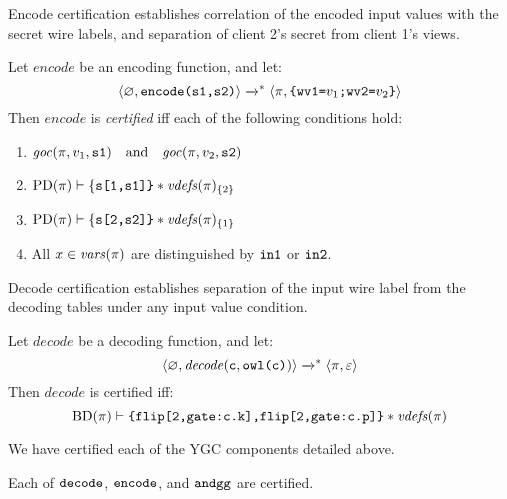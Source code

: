 Encode certification establishes correlation of the encoded input values with
the secret wire labels, and separation of client 2's secret from client 1's views. 
\begin{definition}
  \label{definition-ygcencode-certification}
  Let $\mathit{encode}$ be an encoding function, and let:
  $$
  \langle \varnothing,\texttt{encode(s1,s2)} \rangle \xrightarrow{}^{*}
  \langle \pi,\texttt{\{wv1=}v_1\texttt{;wv2=}v_2\texttt{\}} \rangle
  $$
  Then $\mathit{encode}$ is \emph{certified} iff each of the following conditions hold:
  \begin{enumerate}[\hspace{5mm}i.]
  \item $\mathit{goc}(\pi,v_1,\texttt{s1}) \quad \text{and} \quad \mathit{goc}(\pi,v_2,\texttt{s2})$
  \item $\mathrm{PD}(\pi) \vdash \{\texttt{s[1,s1]\}} * \mathit{vdefs}(\pi)_{\{2\}}$
  \item $\mathrm{PD}(\pi) \vdash \{\texttt{s[2,s2]\}} * \mathit{vdefs}(\pi)_{\{1\}}$    
  \item All $x \in \mathit{vars}(\pi)$ are distinguished by $\texttt{in1}$ or $\texttt{in2}$. 
  \end{enumerate}
\end{definition}
Decode certification establishes separation of the input wire
label from the decoding tables under any input value condition. 
\begin{definition}
  \label{definition-ygdecode-certification}
  Let $\mathit{decode}$ be a decoding function, and let:
  $$
  \langle \varnothing,\mathit{decode}(\texttt{c}, \texttt{owl(c)}) \rangle
  \xrightarrow{}^{*} \langle \pi,\varepsilon \rangle
  $$
  Then $\mathit{decode}$ is certified iff:
  $$
  \mathrm{BD}(\pi) \vdash \texttt{\{flip[2,gate:c.k],flip[2,gate:c.p]\}} * \mathit{vdefs}(\pi)
  $$
\end{definition}
We have certified each of the YGC components detailed above. 
\begin{lemma}
  \label{lemma-ygc-certification}
  Each of $\texttt{decode}$, $\texttt{encode}$, and $\texttt{andgg}$ are certified.
\end{lemma}

